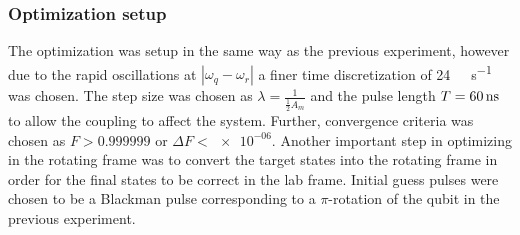 \documentclass[main.tex]{subfiles}
\begin{document}
\subsubsection{Optimization setup}
The optimization was setup in the same way as the previous experiment, however due to the rapid oscillations at \(|\omega_q-\omega_r|\) a finer time discretization of \SI{24}{\giga\samples\per\second} was chosen.
The step size was chosen as \(\lambda = \frac{1}{\frac{1}{2}A_{m}}\) and the pulse length \(T = \SI{60}{\nano\second}\) to allow the coupling to affect the system.
Further, convergence criteria was chosen as \(F>0.999999\) or \(\Delta F < \num{e-06}\).
Another important step in optimizing in the rotating frame was to convert the target states into the rotating frame in order for the final states to be correct in the lab frame.
Initial guess pulses were chosen to be a Blackman pulse corresponding to a \(\pi\)-rotation of the qubit in the previous experiment.
\end{document}
